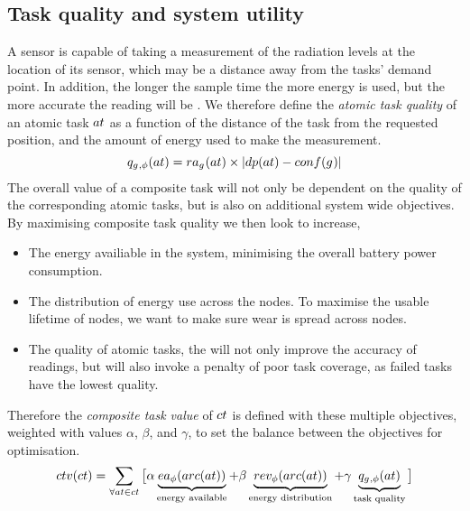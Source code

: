 \newcommand{\functionAtomicTaskQualitySignature}[2]{
	\functionSignature{q_{\varAgent{}{}, \varTime{}{}}} {\varAtomicTask{}{}}
}
\newcommand{\functionCompositeTaskValue}[2]{
	\functionSignature{ctv}{\varCompositeTask{}{}}
}

\newcommand{\functionSystemUtility}[2]{\functionSignature{u_{\setTime{}{}}}{\setCompositeTask{}{}}}
\subsection{Task quality and system utility}

A sensor is capable of taking a measurement of the radiation levels at the location of its sensor, which may be a distance away from the tasks' demand point. In addition, the longer the sample time the more energy is used, but the more accurate the reading will be \cite{dummy}. We therefore define the \textit{atomic task quality} of an atomic task $\varAtomicTask{}{}$ as a function of the distance of the task from the requested position, and the amount of energy used to make the measurement.
	\begin{equation}
	\label{eq:atomic_task_quality}
		\functionAtomicTaskQualitySignature{}{} = \functionTaskResourceAllocation{}{} \times \funcSize{
				\functionTaskDemandPoint{}{} - \functionDeployment{\varAgent{}{}}{}
		}{}
	\end{equation}
The overall value of a composite task will not only be dependent on the quality of the corresponding atomic tasks, but is also on additional system wide objectives.
By maximising composite task quality we then look to increase,
\begin{itemize}
	\item The energy availiable in the system, minimising the overall battery power consumption.
	\item The distribution of energy use across the nodes. To maximise the usable lifetime of nodes, we want to make sure wear is spread across nodes. 
	\item The quality of atomic tasks, the will not only improve the accuracy of readings, but will also invoke a penalty of poor task coverage, as failed tasks have the lowest quality.
\end{itemize}
 Therefore the \textit{composite task value} of $\varCompositeTask{}{}$ is defined with these multiple objectives, weighted with values $\alpha$, $\beta$, and $\gamma$, to set the balance between the objectives for optimisation.
	\begin{equation}
		\label{eq:ctv}
		\functionCompositeTaskValue{}{} = 
		\sum_{\forall \varAtomicTask{}{} \in \varCompositeTask{}{}}
		\big\lbrack
		\alpha\underbrace{\functionEnergyAvailable{\functionTaskArc{}{}}{}}_{\text{energy available}}
		+ \beta\underbrace{\functionEnergyVariability{\functionTaskArc{}{}}{}}_{\text{energy distribution}}
		+ 
		\gamma\underbrace{\functionAtomicTaskQualitySignature{}{}}_{\text{task quality}}
		\big\rbrack
	\end{equation}
